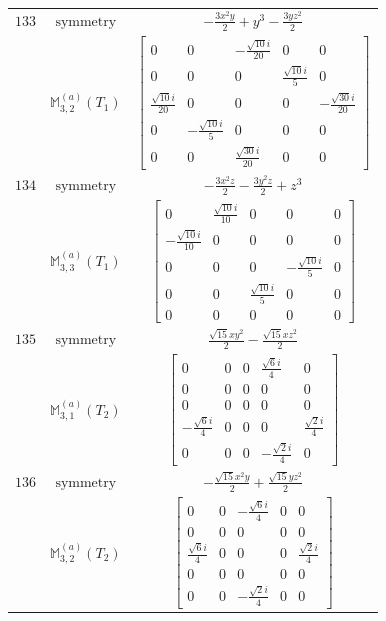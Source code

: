 \documentclass[fleqn,8pt,landscape]{jsarticle}
\begin{document}
\begin{longtable}{ccc}
$ 133 $ & $ \text{symmetry} $ & $ - \frac{3 x^{2} y}{2} + y^{3} - \frac{3 y z^{2}}{2} $ \\
$  $ & $ \mathbb{M}_{3,2}^{(a)}(T_{1}) $ & $ \begin{bmatrix} 0 & 0 & - \frac{\sqrt{10} i}{20} & 0 & 0 \\ 0 & 0 & 0 & \frac{\sqrt{10} i}{5} & 0 \\ \frac{\sqrt{10} i}{20} & 0 & 0 & 0 & - \frac{\sqrt{30} i}{20} \\ 0 & - \frac{\sqrt{10} i}{5} & 0 & 0 & 0 \\ 0 & 0 & \frac{\sqrt{30} i}{20} & 0 & 0 \end{bmatrix} $ \\ \hline
$ 134 $ & $ \text{symmetry} $ & $ - \frac{3 x^{2} z}{2} - \frac{3 y^{2} z}{2} + z^{3} $ \\
$  $ & $ \mathbb{M}_{3,3}^{(a)}(T_{1}) $ & $ \begin{bmatrix} 0 & \frac{\sqrt{10} i}{10} & 0 & 0 & 0 \\ - \frac{\sqrt{10} i}{10} & 0 & 0 & 0 & 0 \\ 0 & 0 & 0 & - \frac{\sqrt{10} i}{5} & 0 \\ 0 & 0 & \frac{\sqrt{10} i}{5} & 0 & 0 \\ 0 & 0 & 0 & 0 & 0 \end{bmatrix} $ \\ \hline
$ 135 $ & $ \text{symmetry} $ & $ \frac{\sqrt{15} x y^{2}}{2} - \frac{\sqrt{15} x z^{2}}{2} $ \\
$  $ & $ \mathbb{M}_{3,1}^{(a)}(T_{2}) $ & $ \begin{bmatrix} 0 & 0 & 0 & \frac{\sqrt{6} i}{4} & 0 \\ 0 & 0 & 0 & 0 & 0 \\ 0 & 0 & 0 & 0 & 0 \\ - \frac{\sqrt{6} i}{4} & 0 & 0 & 0 & \frac{\sqrt{2} i}{4} \\ 0 & 0 & 0 & - \frac{\sqrt{2} i}{4} & 0 \end{bmatrix} $ \\ \hline
$ 136 $ & $ \text{symmetry} $ & $ - \frac{\sqrt{15} x^{2} y}{2} + \frac{\sqrt{15} y z^{2}}{2} $ \\
$  $ & $ \mathbb{M}_{3,2}^{(a)}(T_{2}) $ & $ \begin{bmatrix} 0 & 0 & - \frac{\sqrt{6} i}{4} & 0 & 0 \\ 0 & 0 & 0 & 0 & 0 \\ \frac{\sqrt{6} i}{4} & 0 & 0 & 0 & \frac{\sqrt{2} i}{4} \\ 0 & 0 & 0 & 0 & 0 \\ 0 & 0 & - \frac{\sqrt{2} i}{4} & 0 & 0 \end{bmatrix} $ \\ \hline

\end{longtable}
\end{document}
